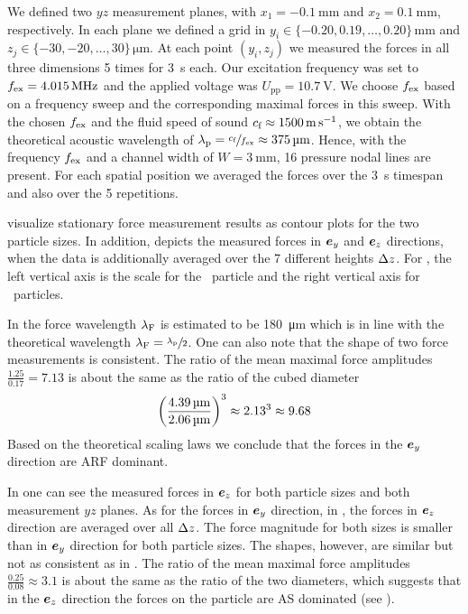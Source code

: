 We defined two $yz$ measurement planes, with $x_{1} = \SI{-0.1}{\mm}$ and 
$x_{2} = \SI{0.1}{\mm}$, respectively. In each plane we defined a grid in 
$y_{i} \in \{-0.20,0.19,\dots,0.20\}\, \si{\mm}$ and $z_{j} \in 
\{-30,-20,\dots,30\}\,\si{\um}$. At each point $(y_{i}, z_{j})$ we measured the 
forces in all three dimensions 5 times for \SI{3}{\second} each. Our excitation 
frequency was set to $\fex = \SI{4.015}{\MHz}$ and the applied voltage was 
$U_{\text{pp}} = \SI{10.7}{\volt}$. We choose $f_{\text{ex}}$ based on a frequency sweep 
and the corresponding maximal forces in this sweep. With the chosen $f_{\text{ex}}$ and 
the fluid speed of sound $c_{\text{f}} \approx \SI{1500}{\meter\per\second}$, we obtain 
the theoretical acoustic wavelength of $\lambda_{\text{p}} = \sfrac{c_{\text{f}}}{f_{\text{ex}}} \approx 
\SI{375}{\si{\micro\meter}}$. Hence, with the frequency $f_{\text{ex}}$ and a channel width of $W = 
\SI{3}{\mm}$, 16 pressure nodal lines are present. For each spatial position we 
averaged the forces over the \SI{3}{\second} timespan and also over the 5 
repetitions.

 visualize stationary force measurement 
results as contour plots for the two particle sizes. In addition, 
 depicts the measured forces in $\bm{e}_{y}$ and 
$\bm{e}_{z}$ directions, when the data is additionally averaged over the 7 different 
heights $\Delta z$. For , the left vertical axis 
is the scale for the \Dfour~particle and the right vertical axis for 
\Dtwo~particles.

In  the force wavelength $\lambda_{\text{F}}$ is estimated to be 
\SI{180}{\um} which is in line with the theoretical wavelength $\lambda_{\text{F}} = 
\sfrac{\lambda_{\text{p}}}{2}$. One can also note that the shape of two force measurements is 
consistent. The ratio of the mean maximal force amplitudes $\frac{1.25}{0.17} = 
7.13$ is about the same as the ratio of the cubed diameter
\begin{equation}
  {\left( \frac{\SI{4.39}{\micro\meter}}{\SI{2.06}{\micro\meter}} \right)}^{3} \approx 2.13^{3} \approx 9.68
 \label{eq:TC-ARF-AS-scaling}
\end{equation}
Based on the theoretical scaling laws we conclude that the forces in the $\bm{e}_{y}$ 
direction are ARF dominant.


In  one can see the measured forces in $\bm{e}_{z}$ for both particle 
sizes and both measurement $yz$ planes. As for the forces in $\bm{e}_{y}$ direction, 
in , the forces in $\bm{e}_{z}$ direction are averaged over all 
$\Delta z$. The force magnitude for both sizes is smaller than in $\bm{e}_{y}$ direction 
for both particle sizes. The shapes, however, are similar but not as consistent 
as in . The ratio of the mean maximal force amplitudes 
$\frac{0.25}{0.08} \approx 3.1$ is about the same as the ratio of the two 
diameters, which suggests that in the $\bm{e}_{z}$ direction the forces on the 
particle are AS dominated (see ).

